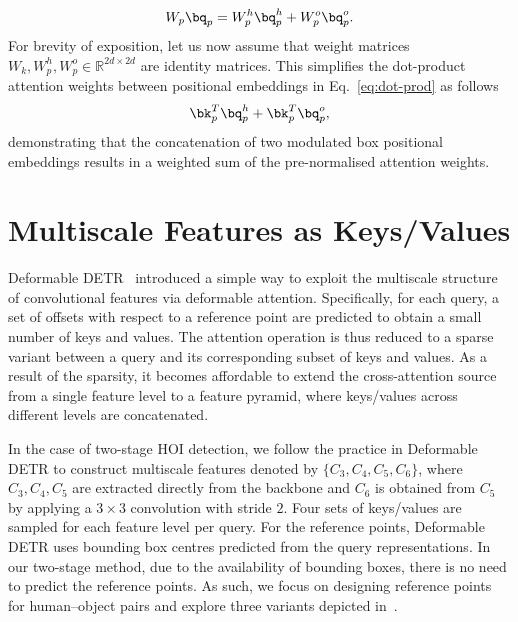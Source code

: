 \documentclass[10pt,twocolumn,letterpaper]{article}
\begin{document}
\begin{equation}
   W_p \bq_p = W_p^h \bq_p^h + W_p^o \bq_p^o.
\end{equation}
For brevity of exposition, let us now assume that weight matrices $W_k, W_p^h, W_p^o \in \mathbb{R}^{2d\times 2d}$ are identity matrices. This simplifies the dot-product attention weights between positional embeddings in Eq.~\ref{eq:dot-prod} as follows
\begin{equation}
   \bk_p^T \bq_p^h + \bk_p^T \bq_p^o,
\end{equation}
demonstrating that the concatenation of two modulated box positional embeddings results in a weighted sum of the pre-normalised attention weights.

\section{Multiscale Features as Keys/Values}

Deformable DETR~\cite{deform-detr} introduced a simple way to exploit the multiscale structure of convolutional features via deformable attention. Specifically, for each query, a set of offsets with respect to a reference point are predicted to obtain a small number of keys and values. The attention operation is thus reduced to a sparse variant between a query and its corresponding subset of keys and values. As a result of the sparsity, it becomes affordable to extend the cross-attention source from a single feature level to a feature pyramid, where keys/values across different levels are concatenated.

In the case of two-stage HOI detection, we follow the practice in Deformable DETR to construct multiscale features denoted by $\{C_3, C_4, C_5, C_6\}$, where $C_3, C_4, C_5$ are extracted directly from the backbone and $C_6$ is obtained from $C_5$ by applying a $3\times 3$ convolution with stride $2$. Four sets of keys/values are sampled for each feature level per query. For the reference points, Deformable DETR uses bounding box centres predicted from the query representations. In our two-stage method, due to the availability of bounding boxes, there is no need to predict the reference points. As such, we focus on designing reference points for human--object pairs and explore three variants depicted in~.
\end{document}
